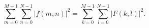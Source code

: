 \begin{equation} \label{eq:2_59}
    \sum\limits_{m=0}^{M-1} \sum\limits_{n=0}^{N-1} |f(m, n)|^2 = \sum\limits_{k=0}^{M-1} \sum\limits_{l=0}^{N-1} |F(k, l)|^2.
\end{equation}














